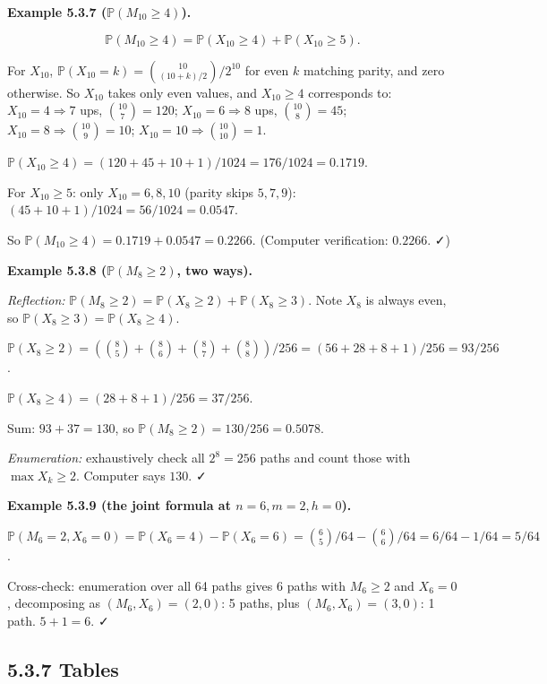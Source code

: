 \documentclass[
  10pt,
  twoside]{book}
\begin{document}
\textbf{Example 5.3.7 (\(\mathbb P(M_{10} \ge 4)\)).}

\[\mathbb P(M_{10} \ge 4) = \mathbb P(X_{10} \ge 4) + \mathbb P(X_{10} \ge 5).\]

For \(X_{10}\), \(\mathbb P(X_{10} = k) = \binom{10}{(10+k)/2}/2^{10}\)
for even \(k\) matching parity, and zero otherwise. So \(X_{10}\) takes
only even values, and \(X_{10} \ge 4\) corresponds to:
\(X_{10} = 4 \Rightarrow 7\) ups, \(\binom{10}{7} = 120\);
\(X_{10} = 6 \Rightarrow 8\) ups, \(\binom{10}{8} = 45\);
\(X_{10} = 8 \Rightarrow \binom{10}{9} = 10\);
\(X_{10} = 10 \Rightarrow \binom{10}{10} = 1\).

\(\mathbb P(X_{10} \ge 4) = (120 + 45 + 10 + 1)/1024 = 176/1024 = 0.1719\).

For \(X_{10} \ge 5\): only \(X_{10} = 6, 8, 10\) (parity skips
\(5, 7, 9\)): \((45 + 10 + 1)/1024 = 56/1024 = 0.0547\).

So \(\mathbb P(M_{10} \ge 4) = 0.1719 + 0.0547 = 0.2266\). (Computer
verification: \(0.2266\). ✓)

\textbf{Example 5.3.8 (\(\mathbb P(M_8 \ge 2)\), two ways).}

\emph{Reflection:}
\(\mathbb P(M_8 \ge 2) = \mathbb P(X_8 \ge 2) + \mathbb P(X_8 \ge 3)\).
Note \(X_8\) is always even, so
\(\mathbb P(X_8 \ge 3) = \mathbb P(X_8 \ge 4)\).

\(\mathbb P(X_8 \ge 2) = (\binom{8}{5} + \binom{8}{6} + \binom{8}{7} + \binom{8}{8})/256 = (56 + 28 + 8 + 1)/256 = 93/256\).

\(\mathbb P(X_8 \ge 4) = (28 + 8 + 1)/256 = 37/256\).

Sum: \(93 + 37 = 130\), so \(\mathbb P(M_8 \ge 2) = 130/256 = 0.5078\).

\emph{Enumeration:} exhaustively check all \(2^8 = 256\) paths and count
those with \(\max X_k \ge 2\). Computer says \(130\). ✓

\textbf{Example 5.3.9 (the joint formula at \(n = 6, m = 2, h = 0\)).}

\(\mathbb P(M_6 = 2, X_6 = 0) = \mathbb P(X_6 = 4) - \mathbb P(X_6 = 6) = \binom{6}{5}/64 - \binom{6}{6}/64 = 6/64 - 1/64 = 5/64\).

Cross-check: enumeration over all 64 paths gives 6 paths with
\(M_6 \ge 2\) and \(X_6 = 0\), decomposing as \((M_6, X_6) = (2, 0)\): 5
paths, plus \((M_6, X_6) = (3, 0)\): 1 path. \(5 + 1 = 6\). ✓

\subsection{5.3.7 Tables}\label{tables-13}
\end{document}
